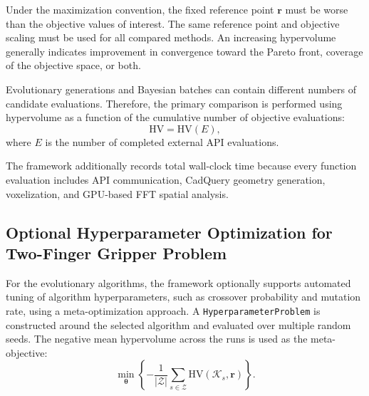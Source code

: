 Under the maximization convention, the fixed reference point $\mathbf{r}$ must be worse than the
objective values of interest. The same reference point and objective scaling must be used for all
compared methods. An increasing hypervolume generally indicates improvement in convergence toward
the Pareto front, coverage of the objective space, or both.

Evolutionary generations and Bayesian batches can contain different numbers of candidate
evaluations. Therefore, the primary comparison is performed using hypervolume as a function of the
cumulative number of objective evaluations:
\begin{equation}
    \mathrm{HV}=\mathrm{HV}(E),
\end{equation}
where $E$ is the number of completed external API evaluations.

The framework additionally records total wall-clock time because every function evaluation includes
API communication, CadQuery geometry generation, voxelization, and GPU-based FFT spatial analysis.



\subsection{Optional Hyperparameter Optimization for Two-Finger Gripper Problem}
\label{sec:two_finger_hyperparameter_optimization}

For the evolutionary algorithms, the framework optionally supports automated tuning of algorithm
hyperparameters, such as crossover probability and mutation rate, using a meta-optimization
approach. A \texttt{HyperparameterProblem} is constructed around the selected algorithm and
evaluated over multiple random seeds. The negative mean hypervolume across the runs is used as the
meta-objective:
\begin{equation}
    \min_{\boldsymbol{\theta}}
    \left\{
        -\frac{1}{|\mathcal{Z}|}
        \sum_{s\in\mathcal{Z}}
        \mathrm{HV}(\mathcal{K}_s,\mathbf{r})
    \right\}.
\end{equation}

